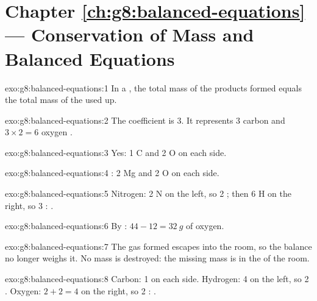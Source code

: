 \section*{Chapter \ref{ch:g8:balanced-equations} --- Conservation of Mass and Balanced Equations}

\begin{solution}{exo:g8:balanced-equations:1}
In a , the total mass of the products formed equals the
total mass of the  used up.
\end{solution}

\begin{solution}{exo:g8:balanced-equations:2}
The coefficient is 3. It represents 3 carbon  and $3 \times 2 = 6$
oxygen .
\end{solution}

\begin{solution}{exo:g8:balanced-equations:3}
Yes: 1 C and 2 O on each side.
\end{solution}

\begin{solution}{exo:g8:balanced-equations:4}
: 2 Mg and 2 O on each side.
\end{solution}

\begin{solution}{exo:g8:balanced-equations:5}
Nitrogen: 2 N on the left, so 2 ; then 6 H on the right, so 3
: .
\end{solution}

\begin{solution}{exo:g8:balanced-equations:6}
By : $44 - 12 = \qty{32}{g}$ of oxygen.
\end{solution}

\begin{solution}{exo:g8:balanced-equations:7}
The gas formed escapes into the room, so the balance no longer weighs
it. No mass is destroyed: the missing mass is in the  of the room.
\end{solution}

\begin{solution}{exo:g8:balanced-equations:8}
Carbon: 1 on each side. Hydrogen: 4 on the left, so 2 . Oxygen:
$2 + 2 = 4$ on the right, so 2 :
.
\end{solution}

